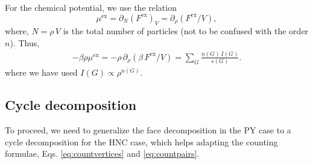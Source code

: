 \documentclass[preprint]{revtex4-1}
\newcommand{\supex}[1]{ { { #1 }^{ \mathrm{ex} } } }
\newcommand{\Fex}{\supex{F}}
\newcommand{\muex}{\supex{\mu}}
\begin{document}
For the chemical potential, we use the relation
\begin{equation}
  \muex = \partial_N(\Fex)_V = \partial_\rho(\Fex/V),
  \label{eq:muexdFex}
\end{equation}
where,
$N = \rho \, V$
is the total number of particles
(not to be confused with the order $n$).
%
Thus,
%
\begin{align}
    - \beta \rho \muex
  =
  -\rho \, \partial_\rho(\beta \, \Fex/V)
  =
    \sum_G \frac{ n(G) \, I(G) } { s(G) }.
\label{eq:hncmugsum}
\end{align}
where we have used $I(G) \propto \rho^{n(G)}$.





\subsection{Cycle decomposition}




To proceed, we need to generalize the face decomposition in the PY case
  to a cycle decomposition for the HNC case,
  which helps adapting the counting formulae,
  Eqs. \eqref{eq:countvertices} and \eqref{eq:countpairs}.
\end{document}
